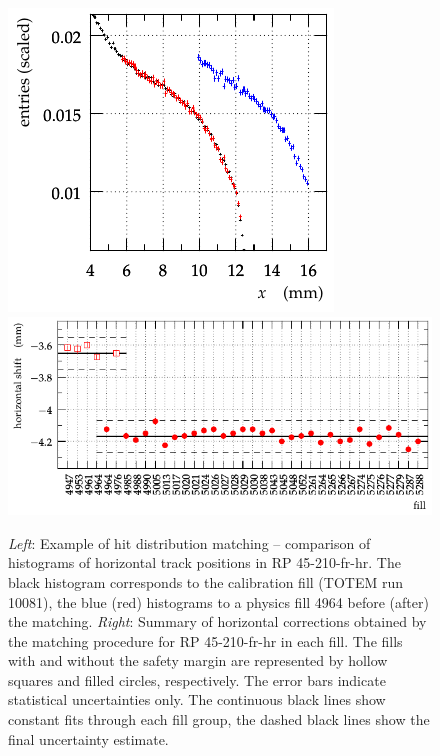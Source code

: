 \documentclass{article}
\begin{document}
\begin{figure}[h!]
\begin{center}
\hskip-2mm
\hbox{\includegraphics{fig/summary/match_method_example.pdf}}
\includegraphics{fig/summary/match_result_cmp_mean.pdf}
\hskip-2mm
\caption{%
{\it Left}: Example of hit distribution matching -- comparison of histograms of horizontal track positions in RP 45-210-fr-hr. The black histogram corresponds to the calibration fill (TOTEM run 10081), the blue (red) histograms to a physics fill 4964 before (after) the matching.\hfil\break
{\it Right}: Summary of horizontal corrections obtained by the matching procedure for RP 45-210-fr-hr in each fill. The fills with and without the safety margin are represented by hollow squares and filled circles, respectively. The error bars indicate statistical uncertainties only. The continuous black lines show constant fits through each fill group, the dashed black lines show the final uncertainty estimate.
}
\label{fig:al_matching}
\end{center}
\end{figure}



\end{document}
